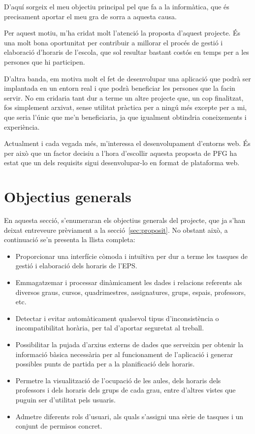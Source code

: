 \documentclass[a4paper,12pt]{ThesisStyle}
\begin{document}
D'aquí sorgeix el meu objectiu principal pel que fa a la informàtica, que és precisament aportar el meu gra de sorra a aquesta causa.

Per aquest motiu, m'ha cridat molt l'atenció la proposta d'aquest projecte. És una molt bona oportunitat per contribuir a millorar el procés de gestió i elaboració d'horaris de l'escola, que sol resultar bastant costós en temps per a les persones que hi participen.

D'altra banda, em motiva molt el fet de desenvolupar una aplicació que podrà ser implantada en un entorn real i que podrà beneficiar les persones que la facin servir. No em cridaria tant dur a terme un altre projecte que, un cop finalitzat, fos simplement arxivat, sense utilitat pràctica per a ningú més excepte per a mi, que seria l'únic que me'n beneficiaria, ja que igualment obtindria coneixements i experiència.

Actualment i cada vegada més, m'interessa el desenvolupament d'entorns web. És per això que un factor decisiu a l'hora d'escollir aquesta proposta de PFG ha estat que un dels requisits sigui desenvolupar-lo en format de plataforma web.

\section{Objectius generals}
\label{sec:objectius_generals}

En aquesta secció, s'enumeraran els objectius generals del projecte, que ja s'han deixat entreveure prèviament a la secció~\ref{sec:proposit}. No obstant això, a continuació se'n presenta la llista completa:
\begin{itemize}
  \item Proporcionar una interfície còmoda i intuïtiva per dur a terme les tasques de gestió i elaboració dels horaris de l'EPS.
  \item Emmagatzemar i processar dinàmicament les dades i relacions referents als diversos graus, cursos, quadrimestres, assignatures, grups, espais, professors, etc.
  \item Detectar i evitar automàticament qualsevol tipus d'inconsistència o incompatibilitat horària, per tal d'aportar seguretat al treball.
  \item Possibilitar la pujada d'arxius externs de dades que serveixin per obtenir la informació bàsica necessària per al funcionament de l'aplicació i generar possibles punts de partida per a la planificació dels horaris.
  \item Permetre la visualització de l'ocupació de les aules, dels horaris dels professors i dels horaris dels grups de cada grau, entre d'altres vistes que puguin ser d'utilitat pels usuaris.
  \item Admetre diferents rols d'usuari, als quals s'assigni una sèrie de tasques i un conjunt de permisos concret.
\end{itemize}
\end{document}
